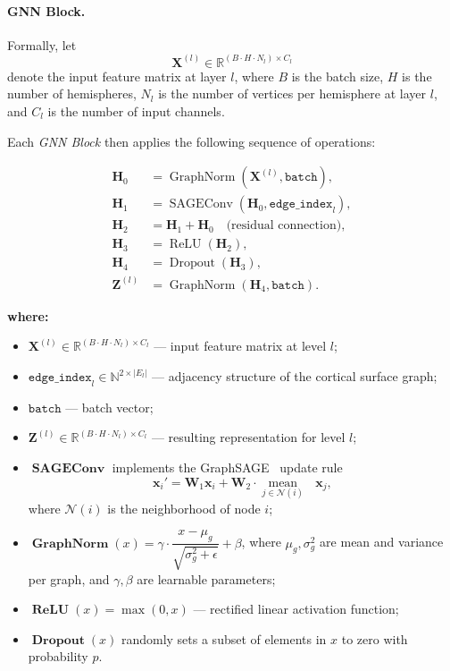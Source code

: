 \documentclass[FCD_GNN.tex]{subfiles}
\begin{document}
\paragraph{GNN Block.}

Formally, let 
\[
\mathbf{X}^{(l)} \in \mathbb{R}^{(B \cdot H \cdot N_l) \times C_l}
\]
denote the input feature matrix at layer $l$, where 
$B$ is the batch size, 
$H$ is the number of hemispheres, 
$N_l$ is the number of vertices per hemisphere at layer $l$, 
and $C_l$ is the number of input channels.  

Each \textit{GNN Block} then applies the following sequence of operations:

\begin{align}
    \mathbf{H}_0 &= \operatorname{GraphNorm}\!\left(\mathbf{X}^{(l)}, \texttt{batch}\right), \\[4pt]
    \mathbf{H}_1 &= \operatorname{SAGEConv}\!\left(\mathbf{H}_0, \texttt{edge\_index}_l\right), \\[4pt]
    \mathbf{H}_2 &= \mathbf{H}_1 + \mathbf{H}_0 \quad \text{(residual connection)}, \\[4pt]
    \mathbf{H}_3 &= \operatorname{ReLU}\!\left(\mathbf{H}_2\right), \\[4pt]
    \mathbf{H}_4 &= \operatorname{Dropout}\!\left(\mathbf{H}_3\right), \\[4pt]
    \mathbf{Z}^{(l)} &= \operatorname{GraphNorm}\!\left(\mathbf{H}_4, \texttt{batch}\right).
\end{align}

\noindent\textbf{where:}
\begin{itemize}
    \item $\mathbf{X}^{(l)} \in \mathbb{R}^{(B \cdot H \cdot N_l)\times C_l}$ — input feature matrix at level $l$;
    \item $\texttt{edge\_index}_l \in \mathbb{N}^{2\times |E_l|}$ — adjacency structure of the cortical surface graph;
    \item $\texttt{batch}$ — batch vector;
    \item $\mathbf{Z}^{(l)} \in \mathbb{R}^{(B \cdot H \cdot N_l)\times C_l}$ — resulting representation for level $l$;
    \item $\operatorname{\textbf{SAGEConv}}$ implements the GraphSAGE~\cite{Hamilton2017GraphSAGE} update rule
    \[
    \mathbf{x}_i' = \mathbf{W}_1 \mathbf{x}_i + \mathbf{W}_2 \cdot \underset{j \in \mathcal{N}(i)}{\operatorname{mean}} \text{ } \mathbf{x}_j,
    \]
    where $\mathcal{N}(i)$ is the neighborhood of node $i$;
    \item $\operatorname{\textbf{GraphNorm}}(x) = \gamma \cdot \dfrac{x - \mu_g}{\sqrt{\sigma_g^2+\epsilon}} + \beta$, where $\mu_g, \sigma_g^2$ are mean and variance per graph, and $\gamma,\beta$ are learnable parameters;
    \item $\operatorname{\textbf{ReLU}}(x) = \max(0, x)$ — rectified linear activation function;
    \item $\operatorname{\textbf{Dropout}}(x)$ randomly sets a subset of elements in $x$ to zero with probability $p$.
\end{itemize}
\end{document}
